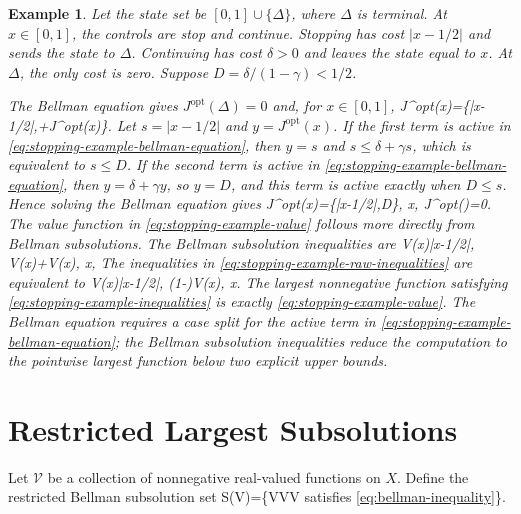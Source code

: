 \documentclass{article}
\newtheorem{example}{Example}
\begin{document}
\begin{example}
Let the state set be $[0,1]\cup\{\Delta\}$, where $\Delta$ is terminal. At $x\in[0,1]$, the controls are stop and continue. Stopping has cost $|x-1/2|$ and sends the state to $\Delta$. Continuing has cost $\delta>0$ and leaves the state equal to $x$. At $\Delta$, the only cost is zero. Suppose $D=\delta/(1-\gamma)<1/2$.

The Bellman equation gives $J^\textrm{opt}(\Delta)=0$ and, for $x\in[0,1]$,
\BEQ
J^\textrm{opt}(x)=\min\{|x-1/2|,\delta+\gamma J^\textrm{opt}(x)\}.
\label{eq:stopping-example-bellman-equation}
\EEQ
Let $s=|x-1/2|$ and $y=J^\textrm{opt}(x)$. If the first term is active in \eqref{eq:stopping-example-bellman-equation}, then $y=s$ and $s\leq \delta+\gamma s$, which is equivalent to $s\leq D$. If the second term is active in \eqref{eq:stopping-example-bellman-equation}, then $y=\delta+\gamma y$, so $y=D$, and this term is active exactly when $D\leq s$. Hence solving the Bellman equation gives
\BEQ
J^\textrm{opt}(x)=\min\{|x-1/2|,D\},
\quad x\in[0,1],
\qquad
J^\textrm{opt}(\Delta)=0.
\label{eq:stopping-example-value}
\EEQ
The value function in \eqref{eq:stopping-example-value} follows more directly from Bellman subsolutions. The Bellman subsolution inequalities are
\BEQ
V(x)\leq |x-1/2|,
\qquad
V(x)\leq\delta+\gamma V(x),
\quad x\in[0,1],
\label{eq:stopping-example-raw-inequalities}
\EEQ
The inequalities in \eqref{eq:stopping-example-raw-inequalities} are equivalent to
\BEQ
V(x)\leq |x-1/2|,
\qquad
(1-\gamma)V(x)\leq\delta,
\quad x\in[0,1].
\label{eq:stopping-example-inequalities}
\EEQ
The largest nonnegative function satisfying \eqref{eq:stopping-example-inequalities} is exactly \eqref{eq:stopping-example-value}. The Bellman equation requires a case split for the active term in \eqref{eq:stopping-example-bellman-equation}; the Bellman subsolution inequalities reduce the computation to the pointwise largest function below two explicit upper bounds.
\end{example}

\section{Restricted Largest Subsolutions}

Let $\mathcal V$ be a collection of nonnegative real-valued functions on $X$. Define the restricted Bellman subsolution set
\BEQ
\mathcal S(\mathcal V)=\{V\in\mathcal V\mid V\textrm{ satisfies }\eqref{eq:bellman-inequality}\}.
\label{eq:restricted-subsolutions}
\EEQ
\end{document}
